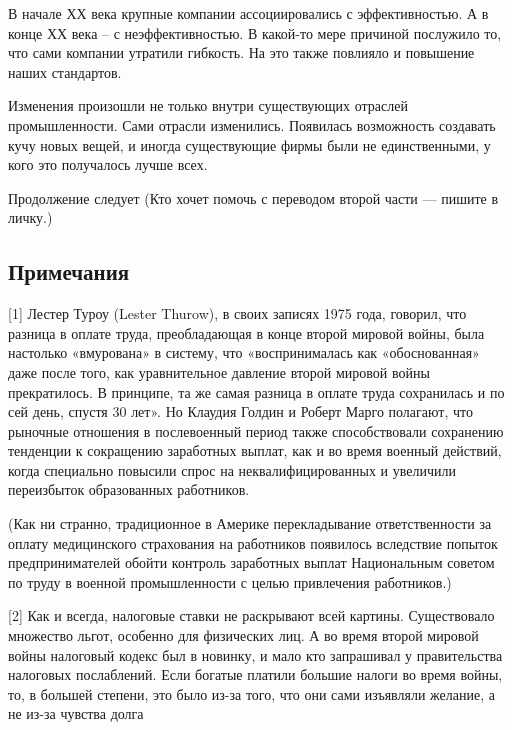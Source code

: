 \documentclass[ebook,12pt,oneside,openany]{memoir}
\begin{document}
В начале ХХ века крупные компании ассоциировались с эффективностью. А
в конце ХХ века – с неэффективностью. В какой-то мере причиной
послужило то, что сами компании утратили гибкость. На это также
повлияло и повышение наших стандартов. \newline

Изменения произошли не только внутри существующих отраслей
промышленности. Сами отрасли изменились. Появилась возможность
создавать кучу новых вещей, и иногда существующие фирмы были не
единственными, у кого это получалось лучше всех. \newline

Продолжение следует (Кто хочет помочь с переводом второй части —
пишите в личку.) \newline

\subsection{Примечания}

[1] Лестер Туроу (Lester Thurow), в своих записях 1975 года, говорил,
что разница в оплате труда, преобладающая в конце второй мировой
войны, была настолько «вмурована» в систему, что «воспринималась как
«обоснованная» даже после того, как уравнительное давление второй
мировой войны прекратилось. В принципе, та же самая разница в оплате
труда сохранилась и по сей день, спустя 30 лет». Но Клаудия Голдин и
Роберт Марго полагают, что рыночные отношения в послевоенный период
также способствовали сохранению тенденции к сокращению заработных
выплат, как и во время военный действий, когда специально повысили
спрос на неквалифицированных и увеличили переизбыток образованных
работников. \newline

(Как ни странно, традиционное в Америке перекладывание ответственности
за оплату медицинского страхования на работников появилось вследствие
попыток предпринимателей обойти контроль заработных выплат
Национальным советом по труду в военной промышленности с целью
привлечения работников.) \newline

[2] Как и всегда, налоговые ставки не раскрывают всей картины.
Существовало множество льгот, особенно для физических лиц. А во время
второй мировой войны налоговый кодекс был в новинку, и мало кто
запрашивал у правительства налоговых послаблений. Если богатые платили
большие налоги во время войны, то, в большей степени, это было из-за
того, что они сами изъявляли желание, а не из-за чувства долга \newline
\end{document}
